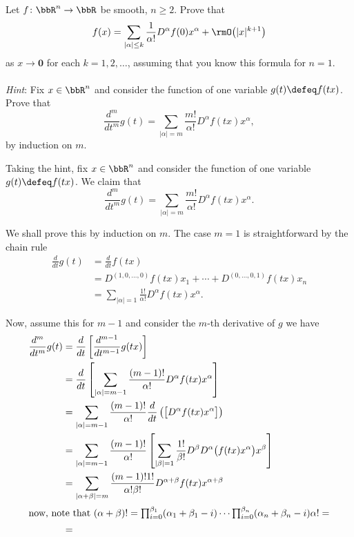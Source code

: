 \begin{problem}
  Let \(f\colon\bbR^n\to\bbR\) be smooth, \(n\geq 2\). Prove that
  \[
    f(x)=\sum_{|\alpha|\leq k}
    \frac{1}{\alpha!}D^\alpha f(0)x^\alpha+\rmO\bigl(|x|^{k+1}\bigr)
  \]
  as \(x\to\mathbf{0}\) for each \(k=1,2,\dotsc\), assuming that you know this
  formula for \(n=1\).
  \\\\
  \emph{Hint}: Fix \(x\in\bbR^n\) and consider the function of one variable
  \(g(t)\defeq f(tx)\). Prove that
  \[
    \frac{d^m}{d t^m}g(t)
    =\sum_{|\alpha|=m}\frac{m!}{\alpha!} D^\alpha f(tx)x^\alpha,
  \]
  by induction on \(m\).
\end{problem}
\begin{solution}
  Taking the hint, fix \(x\in\bbR^n\) and consider the function of one
  variable \(g(t)\defeq f(tx)\). We claim that
  \[
    \frac{d^m}{d t^m}g(t)%
    =\sum_{|\alpha|=m}\frac{m!}{\alpha!}D^\alpha f(tx)x^\alpha.%
  \]
  \begin{subproof}
    We shall prove this by induction on \(m\). The case \(m=1\) is
    straightforward by the chain rule
    \begin{align*}
      \frac{d}{dt}g(t)
      &=\frac{d}{dt}f(tx)\\
      &=D^{(1,0,\dotsc,0)}f(tx)x_1+\dotsb+D^{(0,\dotsc,0,1)}f(tx)x_n\\
      &=\sum_{|\alpha|=1}\frac{1!}{\alpha!}D^\alpha f(tx)x^\alpha.
    \end{align*}

    Now, assume this for \(m-1\) and consider the \(m\)-th derivative of
    \(g\) we have
    \begin{align*}
      \frac{d^m}{dt^m}g(t)%
      &=\frac{d}{dt}\left[\frac{d^{m-1}}{dt^{m-1}}g(tx)\right]\\
      &=\frac{d}{dt}%
        \left[%
        \sum_{|\alpha|=m-1}\frac{(m-1)!}{\alpha!}D^\alpha f(tx)x^\alpha%
        \right]\\
      &=\sum_{|\alpha|=m-1}\frac{(m-1)!}{\alpha!}%
        \frac{d}{dt}%
        \left(
        \bigl[%
        D^\alpha f(tx)x^\alpha%
        \bigr]
        \right)\\
      &=\sum_{|\alpha|=m-1}\frac{(m-1)!}{\alpha!}%
        \left[%
        \sum_{|\beta|=1}\frac{1!}{\beta!}D^\beta D^\alpha\bigl(f(tx)x^\alpha\bigr)x^\beta
        \right]\\
      &=\sum_{|\alpha+\beta|=m}
        \frac{(m-1)!1!}{\alpha!\beta!}D^{\alpha+\beta}f(tx)x^{\alpha+\beta}\\
      \intertext{now, note that
      \((\alpha+\beta)!=\prod_{i=0}^{\beta_1}(\alpha_1+\beta_1-i)\dotsm\prod_{i=0}^{\beta_n}(\alpha_n+\beta_n-i)\alpha!=\)}
      &=
    \end{align*}
  \end{subproof}
\end{solution}
\newpage

